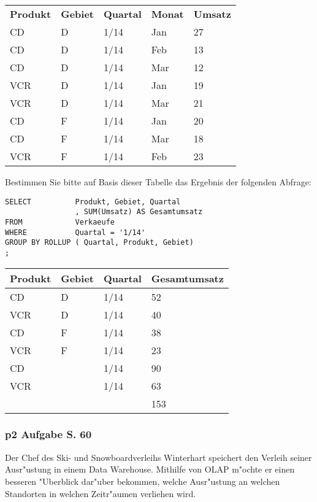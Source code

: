 \begin{tabular}{l l l l l}
    \rowcolor{LightSlateGray}
    \textbf{Produkt}    & \textbf{Gebiet}   & \textbf{Quartal}  & \textbf{Monat}    & \textbf{Umsatz}\\
    CD  & D & 1/14  & Jan   & 27\\
    CD  & D & 1/14  & Feb   & 13\\
    CD  & D & 1/14  & Mar   & 12\\
    VCR & D & 1/14  & Jan   & 19\\
    VCR & D & 1/14  & Mar   & 21\\
    CD  & F & 1/14  & Jan   & 20\\
    CD  & F & 1/14  & Mar   & 18\\
    VCR & F & 1/14  & Feb   & 23\\
\end{tabular}

\bigskip

\noindent
Bestimmen Sie bitte auf Basis dieser Tabelle das Ergebnis der folgenden Abfrage:\\

\lstset{style=customSQL}
\begin{lstlisting}
SELECT          Produkt, Gebiet, Quartal
                , SUM(Umsatz) AS Gesamtumsatz
FROM            Verkaeufe
WHERE           Quartal = '1/14'
GROUP BY ROLLUP ( Quartal, Produkt, Gebiet)
;
\end{lstlisting}

\bigskip

\begin{tabular}{ l l l l }
    \textbf{Produkt} & \textbf{Gebiet} & \textbf{Quartal} & \textbf{Gesamtumsatz}\\\hline
    \rowcolor{NavyBlue!10}  CD  & D & 1/14  & 52\\
    \rowcolor{NavyBlue!10}  VCR & D & 1/14  & 40\\
    \rowcolor{NavyBlue!10}  CD  & F & 1/14  & 38\\
    \rowcolor{NavyBlue!10}  VCR & F & 1/14  & 23\\\hline
    \rowcolor{NavyBlue!20}  CD  &   & 1/14  & 90\\
    \rowcolor{NavyBlue!20}  VCR &   & 1/14  & 63\\\hline
    \rowcolor{NavyBlue!30}      &   &       & 153\\
\end{tabular}

\subsubsection{p2 Aufgabe S. 60}
Der Chef des Ski- und Snowboardverleihs Winterhart speichert den Verleih seiner Ausr"ustung in einem Data Warehouse.
Mithilfe von OLAP m"ochte er einen besseren "Uberblick dar"uber bekommen, welche Ausr"ustung an welchen Standorten in welchen Zeitr"aumen verliehen wird.\\

